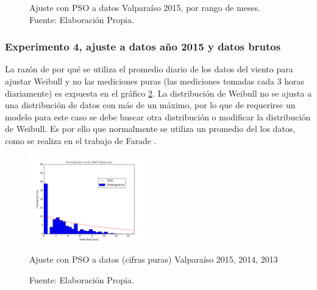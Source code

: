 \begin{figure}[ht!]
{    }%
    \caption{Ajuste con PSO a datos Valparaíso 2015, por rango de meses.\\ Fuente: Elaboración Propia.}
    \label{fig:subfigures}
\end{figure}

\subsubsection{Experimento 4, ajuste a datos año 2015 y datos brutos}
La razón de por qué se utiliza el promedio diario de los datos del viento para ajustar Weibull y no las mediciones puras (las mediciones tomadas cada 3 horas diariamente) es expuesta en el gráfico \ref{fig:pso_valpo_15_all_data}. La distribución de Weibull no se ajusta a una distribución de datos con más de un máximo, por lo que de requerirse un modelo para este caso se debe buscar otra distribución o modificar la distribución de Weibull. Es por ello que normalmente se utiliza un promedio del los datos, como se realiza en el trabajo de Farade \cite{Fadare08}.
\begin{figure}[ht!]
    \centering
    \captionsetup{justification=centering,margin=2cm}
    \includegraphics[width=0.45\textwidth]{figures/result_2015_all_data.png}
    \caption{Ajuste con PSO a datos (cifras puras) Valparaíso 2015, 2014, 2013}
    \vspace{-.25cm}
    \caption*{Fuente: Elaboración Propia.}
    \label{fig:pso_valpo_15_all_data}
\end{figure}
\pagebreak
\newpage
